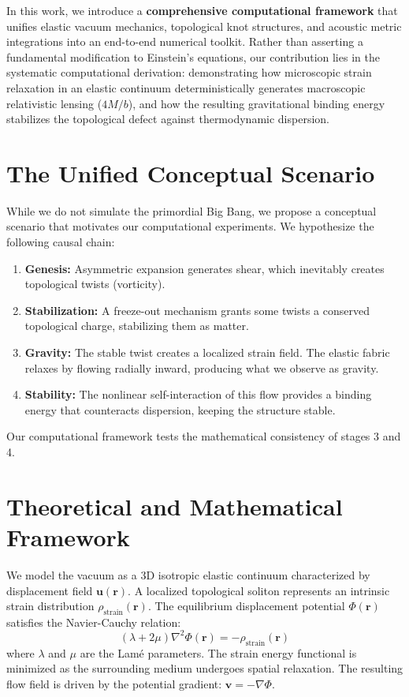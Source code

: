 \documentclass[11pt,a4paper]{article}
\begin{document}
In this work, we introduce a \textbf{comprehensive computational framework} that unifies elastic vacuum mechanics, topological knot structures, and acoustic metric integrations into an end-to-end numerical toolkit. Rather than asserting a fundamental modification to Einstein's equations, our contribution lies in the systematic computational derivation: demonstrating how microscopic strain relaxation in an elastic continuum deterministically generates macroscopic relativistic lensing ($4M/b$), and how the resulting gravitational binding energy stabilizes the topological defect against thermodynamic dispersion.

\section{The Unified Conceptual Scenario}
While we do not simulate the primordial Big Bang, we propose a conceptual scenario that motivates our computational experiments. We hypothesize the following causal chain:
\begin{enumerate}
    \item \textbf{Genesis:} Asymmetric expansion generates shear, which inevitably creates topological twists (vorticity).
    \item \textbf{Stabilization:} A freeze-out mechanism grants some twists a conserved topological charge, stabilizing them as matter.
    \item \textbf{Gravity:} The stable twist creates a localized strain field. The elastic fabric relaxes by flowing radially inward, producing what we observe as gravity.
    \item \textbf{Stability:} The nonlinear self-interaction of this flow provides a binding energy that counteracts dispersion, keeping the structure stable.
\end{enumerate}
Our computational framework tests the mathematical consistency of stages 3 and 4.

\section{Theoretical and Mathematical Framework}
We model the vacuum as a 3D isotropic elastic continuum characterized by displacement field \(\mathbf{u}(\mathbf{r})\). A localized topological soliton represents an intrinsic strain distribution $\rho_{\text{strain}}(\mathbf{r})$. The equilibrium displacement potential $\Phi(\mathbf{r})$ satisfies the Navier-Cauchy relation:
\begin{equation}
(\lambda + 2\mu) \nabla^2 \Phi(\mathbf{r}) = -\rho_{\text{strain}}(\mathbf{r})
\end{equation}
where \(\lambda\) and \(\mu\) are the Lamé parameters. The strain energy functional is minimized as the surrounding medium undergoes spatial relaxation. The resulting flow field is driven by the potential gradient: \(\mathbf{v} = -\nabla \Phi\). 
\end{document}
